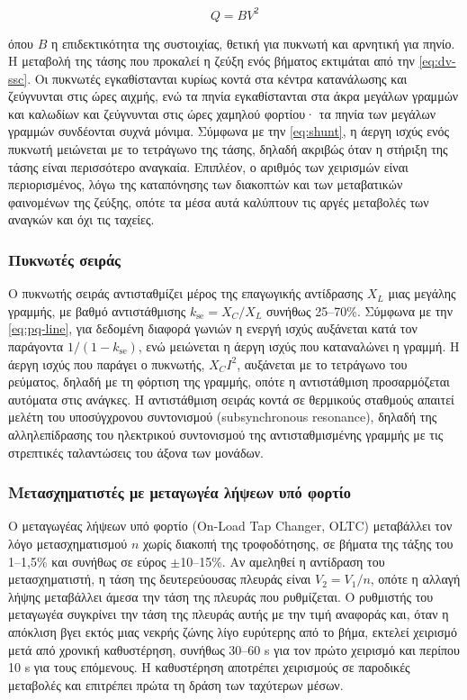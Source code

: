 \begin{equation}
Q = B V^2
\label{eq:shunt}
\end{equation}

όπου $B$ η επιδεκτικότητα της συστοιχίας, θετική για πυκνωτή και αρνητική για πηνίο. Η
μεταβολή της τάσης που προκαλεί η ζεύξη ενός βήματος εκτιμάται από την \eqref{eq:dv-ssc}. Οι
πυκνωτές εγκαθίστανται κυρίως κοντά στα κέντρα κατανάλωσης και ζεύγνυνται στις ώρες αιχμής,
ενώ τα πηνία εγκαθίστανται στα άκρα μεγάλων γραμμών και καλωδίων και ζεύγνυνται στις ώρες
χαμηλού φορτίου· τα πηνία των μεγάλων γραμμών συνδέονται συχνά μόνιμα. Σύμφωνα με την
\eqref{eq:shunt}, η άεργη ισχύς ενός πυκνωτή μειώνεται με το τετράγωνο της τάσης, δηλαδή
ακριβώς όταν η στήριξη της τάσης είναι περισσότερο αναγκαία. Επιπλέον, ο αριθμός των χειρισμών
είναι περιορισμένος, λόγω της καταπόνησης των διακοπτών και των μεταβατικών φαινομένων της
ζεύξης, οπότε τα μέσα αυτά καλύπτουν τις αργές μεταβολές των αναγκών και όχι τις ταχείες.

\subsubsection{Πυκνωτές σειράς}

Ο πυκνωτής σειράς αντισταθμίζει μέρος της επαγωγικής αντίδρασης $X_L$ μιας μεγάλης γραμμής,
με βαθμό αντιστάθμισης $k_{\mathrm{se}} = X_C / X_L$ συνήθως 25--70\%. Σύμφωνα με την
\eqref{eq:pq-line}, για δεδομένη διαφορά γωνιών η ενεργή ισχύς αυξάνεται κατά τον παράγοντα
$1/(1 - k_{\mathrm{se}})$, ενώ μειώνεται η άεργη ισχύς που καταναλώνει η γραμμή. Η άεργη
ισχύς που παράγει ο πυκνωτής, $X_C I^2$, αυξάνεται με το τετράγωνο του ρεύματος, δηλαδή με τη
φόρτιση της γραμμής, οπότε η αντιστάθμιση προσαρμόζεται αυτόματα στις ανάγκες. Η αντιστάθμιση
σειράς κοντά σε θερμικούς σταθμούς απαιτεί μελέτη του υποσύγχρονου συντονισμού
(subsynchronous resonance), δηλαδή της αλληλεπίδρασης του ηλεκτρικού συντονισμού της
αντισταθμισμένης γραμμής με τις στρεπτικές ταλαντώσεις του άξονα των μονάδων.

\subsubsection{Μετασχηματιστές με μεταγωγέα λήψεων υπό φορτίο}
\label{sec:oltc}

Ο μεταγωγέας λήψεων υπό φορτίο (On-Load Tap Changer, OLTC) μεταβάλλει τον λόγο
μετασχηματισμού $n$ χωρίς διακοπή της τροφοδότησης, σε βήματα της τάξης του 1--1,5\% και
συνήθως σε εύρος $\pm$10--15\%. Αν αμεληθεί η αντίδραση του μετασχηματιστή, η τάση της
δευτερεύουσας πλευράς είναι $V_2 = V_1/n$, οπότε η αλλαγή λήψης μεταβάλλει άμεσα την τάση
της πλευράς που ρυθμίζεται. Ο ρυθμιστής του μεταγωγέα συγκρίνει την τάση της πλευράς αυτής με
την τιμή αναφοράς και, όταν η απόκλιση βγει εκτός μιας νεκρής ζώνης λίγο ευρύτερης από το
βήμα, εκτελεί χειρισμό μετά από χρονική καθυστέρηση, συνήθως 30--60 s για τον πρώτο χειρισμό
και περίπου 10 s για τους επόμενους. Η καθυστέρηση αποτρέπει χειρισμούς σε παροδικές
μεταβολές και επιτρέπει πρώτα τη δράση των ταχύτερων μέσων.

